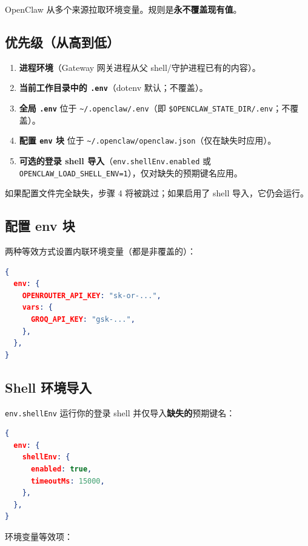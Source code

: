 OpenClaw 从多个来源拉取环境变量。规则是\textbf{永不覆盖现有值}。

\subsection{优先级（从高到低）}


\begin{enumerate}
  \item \textbf{进程环境}（Gateway 网关进程从父 shell/守护进程已有的内容）。
  \item \textbf{当前工作目录中的 \texttt{.env}}（dotenv 默认；不覆盖）。
  \item \textbf{全局 \texttt{.env}} 位于 \texttt{\textasciitilde{}/.openclaw/.env}（即 \texttt{\$OPENCLAW\_STATE\_DIR/.env}；不覆盖）。
  \item \textbf{配置 \texttt{env} 块} 位于 \texttt{\textasciitilde{}/.openclaw/openclaw.json}（仅在缺失时应用）。
  \item \textbf{可选的登录 shell 导入}（\texttt{env.shellEnv.enabled} 或 \texttt{OPENCLAW\_LOAD\_SHELL\_ENV=1}），仅对缺失的预期键名应用。
\end{enumerate}


如果配置文件完全缺失，步骤 4 将被跳过；如果启用了 shell 导入，它仍会运行。

\subsection{配置 env 块}


两种等效方式设置内联环境变量（都是非覆盖的）：

\begin{lstlisting}[language=json]
{
  env: {
    OPENROUTER_API_KEY: "sk-or-...",
    vars: {
      GROQ_API_KEY: "gsk-...",
    },
  },
}
\end{lstlisting}


\subsection{Shell 环境导入}


\texttt{env.shellEnv} 运行你的登录 shell 并仅导入\textbf{缺失的}预期键名：

\begin{lstlisting}[language=json]
{
  env: {
    shellEnv: {
      enabled: true,
      timeoutMs: 15000,
    },
  },
}
\end{lstlisting}


环境变量等效项：

